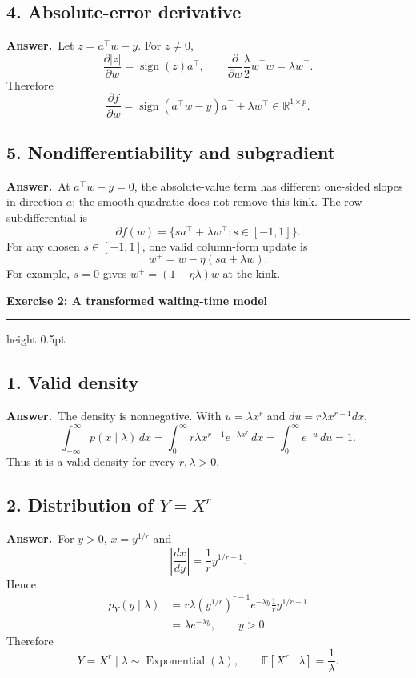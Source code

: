 \documentclass[11pt,a4paper]{article}
\newcommand{\exercise}[2]{%
  \Needspace{8\baselineskip}%
  \par\addvspace{1.1em}%
  {\Large\bfseries\color{examblue}Exercise #1: #2\par}%
  \nobreak\vspace{0.2em}%
  {\color{rulegray}\hrule height 0.5pt}%
  \vspace{0.55em}%
}
\newcommand{\answer}{\textbf{Answer.}\ }
\begin{document}
\subsection*{4. Absolute-error derivative}

\answer Let $z=a^\top w-y$. For $z\neq 0$,
\[
  \frac{\partial |z|}{\partial w}=\operatorname{sign}(z)a^\top,
  \qquad
  \frac{\partial}{\partial w}\frac{\lambda}{2}w^\top w
  =\lambda w^\top.
\]
Therefore
\[
  \boxed{\frac{\partial f}{\partial w}
  =\operatorname{sign}(a^\top w-y)a^\top+\lambda w^\top}
  \in\mathbb{R}^{1\times p}.
\]

\subsection*{5. Nondifferentiability and subgradient}

\answer At $a^\top w-y=0$, the absolute-value term has different one-sided slopes in direction $a$; the smooth quadratic does not remove this kink. The row-subdifferential is
\[
  \partial f(w)=
  \{sa^\top+\lambda w^\top:s\in[-1,1]\}.
\]
For any chosen $s\in[-1,1]$, one valid column-form update is
\[
  \boxed{w^{+}=w-\eta(sa+\lambda w)}.
\]
For example, $s=0$ gives $w^{+}=(1-\eta\lambda)w$ at the kink.

\exercise{2}{A transformed waiting-time model}

\subsection*{1. Valid density}

\answer The density is nonnegative. With $u=\lambda x^r$ and $du=r\lambda x^{r-1}dx$,
\[
  \int_{-\infty}^{\infty}p(x\mid\lambda)\,dx
  =\int_0^\infty r\lambda x^{r-1}e^{-\lambda x^r}\,dx
  =\int_0^\infty e^{-u}\,du=1.
\]
Thus it is a valid density for every $r,\lambda>0$.

\subsection*{2. Distribution of $Y=X^r$}

\answer For $y>0$, $x=y^{1/r}$ and
\[
  \left|\frac{dx}{dy}\right|
  =\frac{1}{r}y^{1/r-1}.
\]
Hence
\begin{align*}
  p_Y(y\mid\lambda)
  &=r\lambda(y^{1/r})^{r-1}e^{-\lambda y}
    \frac{1}{r}y^{1/r-1}\\
  &=\lambda e^{-\lambda y},\qquad y>0.
\end{align*}
Therefore
\[
  \boxed{Y=X^r\mid\lambda\sim\operatorname{Exponential}(\lambda)},
  \qquad
  \boxed{\mathbb{E}[X^r\mid\lambda]=\frac{1}{\lambda}}.
\]
\end{document}
